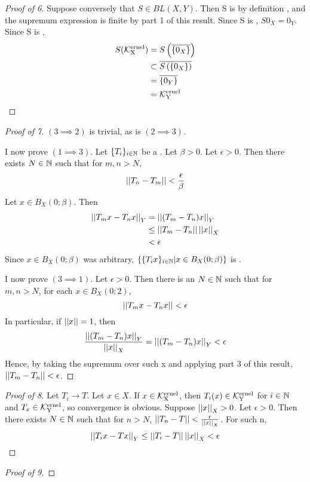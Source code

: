 \begin{prop}
\begin{proof}[Proof of 6]
    Suppose conversely that $S \in BL(X,Y)$. 
    Then S is 
	\Linear 
	by definition
    , and the supremum expression is finite by part 1 
    of this result. 
    Since S is 
	\Linear, $S0_X = 0_Y$. 
    Since S is 
	\Continuous, 
    \begin{align*}
        S(\bf\mathcal{K}\rm^{ernel}_X) &= S\left( \overline{\{0_X\}}\right)\\
        & \subset \overline{S\left( \{0_X\}\right)}\\
        & =\overline{\{0_Y\}} \\
        & = \bf\mathcal{K}\rm^{ernel}_Y
    \end{align*}



\end{proof}
\begin{proof}[Proof of 7]
    $(3 \implies 2)$ is trivial, as is $(2 \implies 3)$.
    
    I now prove $(1\implies 3)$. 
    Let $\{T_i\}_{i \in \mathbb{N}}$ be a 
    \PseudometricCauchySequence.
    Let $\beta > 0$. 
    Let $\epsilon > 0$. 
    Then there exists $N \in \mathbb{N}$
    such that for $m,n > N$, 
    \begin{equation*}
    \left|\left| T_n-T_m \right|\right| < \frac{\epsilon}{\beta}
    \end{equation*}
    Let $x \in B_X(0;\beta)$. 
    Then 
    \begin{align*}
        \left|\left| T_mx-T_nx \right|\right|_Y & = \left|\left| (T_m-T_n)x \right|\right|_Y\\
        & \leq \left|\left| T_m-T_n \right|\right| \left|\left| x \right|\right|_X\\
        & < \epsilon
    \end{align*}
    Since $x \in B_X(0;\beta)$ was arbitrary,
    $\{\{T_ix\}_{i \in \mathbb{N}} | x \in B_X(0;\beta)\}$ is
    \UniformlyCauchy.

    I now prove $(3 \implies 1)$. 
    Let $\epsilon > 0$.
    Then there is an $N \in \mathbb{N}$ 
    such that for $m,n>N$, 
    for each $x \in B_X(0;2)$, 
    \begin{equation*}
    \left|\left| T_mx-T_nx \right|\right| < \epsilon
    \end{equation*}
    In particular, if $\left|\left| x \right|\right|=1$, then 
    \begin{equation}
    \frac{\left|\left| (T_m-T_n)x \right|\right|_Y}{\left|\left| x \right|\right|_X} =\left|\left| (T_m-T_n)x \right|\right|_Y < \epsilon
    \end{equation}
    Hence, by taking the supremum over such x
    and applying part 3 of this result, 
    $\left|\left| T_m-T_n \right|\right| < \epsilon$. 
\end{proof}
\begin{proof}[Proof of 8]
    Let $T_i \to T$. 
    Let $x \in X$. 
    If $x \in \bf\mathcal{K}\rm^{ernel}_X$, then $T_i(x) \in \bf\mathcal{K}\rm^{ernel}_Y$ for $i \in \mathbb{N}$ and $T_x \in \bf\mathcal{K}\rm^{ernel}_Y$, 
    so convergence is obvious. 
    Suppose $\left|\left| x \right|\right|_X > 0$. 
    Let $\epsilon > 0$. 
    Then there exists $N \in \mathbb{N}$ such that
    for $n>N$, $\left|\left| T_n-T \right|\right| < \frac{\epsilon}{\left|\left| x \right|\right|_X}$.
    For such n, 
    \begin{equation*}
    \left|\left| T_ix-Tx \right|\right|_Y \leq \left|\left| T_i-T \right|\right| \left|\left| x \right|\right|_X < \epsilon
    \end{equation*}
\end{proof}
\begin{proof}[Proof of 9]
    

\end{proof}
\end{prop}
